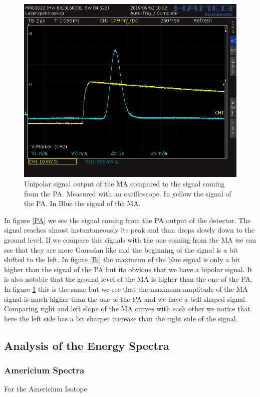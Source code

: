 \documentclass[30pt,a4paper]{article}
\begin{document}
 	\begin{figure}
 		\includegraphics[scale=0.42]{Bilder/OsziUnipolar}
 		\centering
 		\caption[Unipolar]{Unipolar signal output of the MA compared to the signal coming from the PA. Measured with an oscilloscope. In yellow the signal of the PA. In Blue the signal of the MA.}
 		\label{Uni}
 	\end{figure}
 	In figure \ref{PA} we see the signal coming from the PA output of the detector. The signal reaches almost instantaneously its peak and than drops slowly down to the ground level. If we compare this signals with the one coming from the MA we can see that they are more Gaussian like and the beginning of the signal is a bit shifted to the left. In figure \ref{Bi} the maximum of the blue signal is only a bit higher than the signal of the PA but its obvious that we have a bipolar signal. It is also notable that the ground level of the MA is higher than the one of the PA. In figure \ref{Uni} this is the same but we see that the maximum amplitude of the MA signal is much higher than the one of the PA and we have a bell shaped signal. Comparing right and left slope of the MA curves with each other we notice that here the left side has a bit sharper increase than the right side of the signal.
 	\subsection{Analysis of the Energy Spectra}
 	\subsubsection{Americium Spectra}
 	For the Americium Isotope
\end{document}
